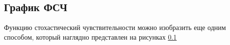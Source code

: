 \subsection{График ФСЧ}
        
    Функцию стохастический чувствительности можно изобразить еще одним способом, который наглядно представлен на рисунках \ref{} 

